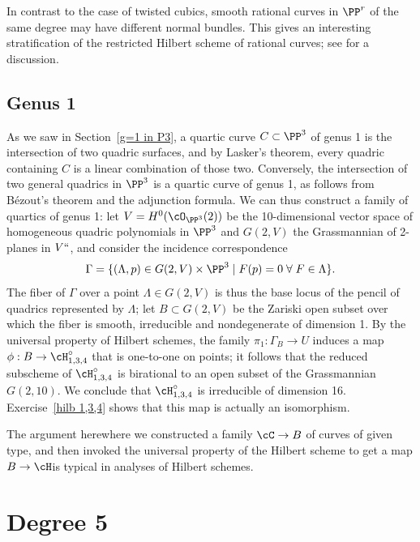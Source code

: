 In contrast to the case of twisted cubics, smooth rational curves in
$\PP^r$ of the same degree may have different normal bundles. This gives
an interesting stratification of the restricted Hilbert scheme of rational
%
%
curves; see \cite{MR3778979} for a discussion.

\subsection*{Genus 1}
 As we saw in Section~\ref{g=1 in P3}, a quartic curve $C \subset \PP^3$
 of genus 1 is the intersection of two quadric surfaces, and by Lasker's
 theorem, every quadric containing $C$ is a linear combination of those
 two. Conversely, the intersection of two general quadrics in $\PP^3$ is
 a quartic curve of genus 1, as follows from B\'ezout's theorem and the
 adjunction formula. We can thus construct a family of quartics of genus
 1: let $V = H^0(\cO_{\PP^3}(2))$ be the 10-dimensional vector space of
 homogeneous quadric polynomials in $\PP^3$ and $G(2,V)$ the
Grassmannian of 2-planes
%
in $V` `$, and consider the
incidence correspondence
%
$$
\Gamma = \{ (\Lambda, p) \in G(2,V) \times \PP^3 \mid F(p)=0 \; \forall \;
F \in \Lambda \}.
$$
The fiber of $\Gamma$ over a point $\Lambda \in G(2,V)$ is thus the
base locus of the pencil of quadrics represented by $\Lambda$; let $B
\subset G(2,V)$ be the Zariski open subset over which the fiber is smooth,
irreducible and nondegenerate of dimension 1. By the universal property of
Hilbert schemes, the family $\pi_1 : \Gamma_B \to U$ induces a map $\phi :
B \to \cH^\circ_{1,3,4}$ that is one-to-one on points; it follows that the
%
reduced subscheme of $\cH^\circ_{1,3,4}$ is birational to an open subset
of the Grassmannian $G(2,10)$. We conclude that $\cH^\circ_{1,3,4}$
is irreducible of dimension 16. Exercise~\ref{hilb 1,3,4} shows that
this map is actually an isomorphism.

The  argument  here\emdash where we constructed a family $\cC \to B$ of
curves of given type, and then invoked the universal property of the
Hilbert scheme to get a map $B \to \cH$\emdash is typical in analyses of
Hilbert schemes.

\section{Degree 5}

